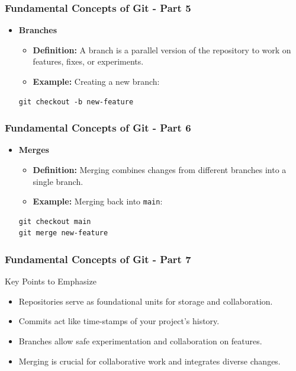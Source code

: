 \documentclass{beamer}
\begin{document}
\begin{frame}[fragile]
    \frametitle{Fundamental Concepts of Git - Part 5}
    \begin{itemize}
        \item \textbf{Branches}
        \begin{itemize}
            \item \textbf{Definition:} A branch is a parallel version of the repository to work on features, fixes, or experiments.
            \item \textbf{Example:} Creating a new branch:
        \end{itemize}
        \begin{lstlisting}
git checkout -b new-feature
        \end{lstlisting}
    \end{itemize}
\end{frame}

\begin{frame}[fragile]
    \frametitle{Fundamental Concepts of Git - Part 6}
    \begin{itemize}
        \item \textbf{Merges}
        \begin{itemize}
            \item \textbf{Definition:} Merging combines changes from different branches into a single branch.
            \item \textbf{Example:} Merging back into \texttt{main}:
        \end{itemize}
        \begin{lstlisting}
git checkout main
git merge new-feature
        \end{lstlisting}
    \end{itemize}
\end{frame}

\begin{frame}[fragile]
    \frametitle{Fundamental Concepts of Git - Part 7}
    \begin{block}{Key Points to Emphasize}
        \begin{itemize}
            \item Repositories serve as foundational units for storage and collaboration.
            \item Commits act like time-stamps of your project's history.
            \item Branches allow safe experimentation and collaboration on features.
            \item Merging is crucial for collaborative work and integrates diverse changes.
        \end{itemize}
    \end{block}
\end{frame}
\end{document}
